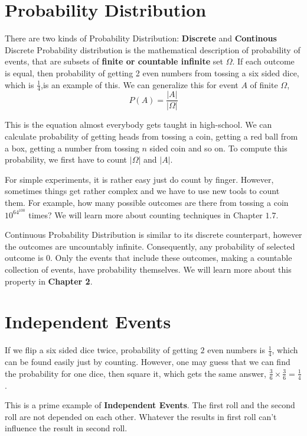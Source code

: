 \section{Probability Distribution}
There are two kinds of Probability Distribution: \textbf{Discrete} and \textbf{Continous}
Discrete Probability distribution is the mathematical  description of probability of events, that are subsets of \textbf{finite or countable infinite} set $\Omega$. 
If each outcome is equal, then probability of getting 2 even numbers from tossing a six sided dice, which is $\frac{1}{4}$,is an example of this. We can generalize this for event $A$ of finite $\Omega$,
$$ P(A) = \frac{|A|}{|\Omega |}$$

This is the equation almost everybody gets taught in high-school. We can calculate probability of getting heads from tossing a coin, getting a red ball from a box, getting a number from tossing $n$ sided coin and so on.
To compute this probability, we first have to count $ | \Omega | $ and $|A |$. 

For simple experiments, it is rather easy just do count by finger.
However, sometimes things get rather complex and we have to use new tools to count them. For example, how many possible outcomes are there from tossing a coin $10^{64^{100}}$ times? We will learn more about counting techniques in Chapter $1.7$.

\par 

Continuous Probability Distribution is similar to its discrete counterpart, however the outcomes are uncountably infinite. Consequently, any probability of selected outcome is $0$. Only the events that include these outcomes, making a countable collection of events, have probability themselves.
We will learn more about this property in \textbf{Chapter 2}.



\section{Independent Events}
If we flip  a six sided dice twice, probability of getting $2$ even numbers is $ \frac{1}{4}$, which can be found easily just by counting. However, one may guess that we can find the probability for one dice, then square it, which gets the same answer, $\frac{3}{6} \times \frac{3}{6}= \frac{1}{4}$.

\par 

This is a prime example of \textbf{Independent Events}. The first roll and the second roll are not depended on each other. Whatever the results in first roll can't influence the result in second roll.

